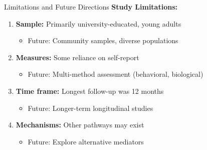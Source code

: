 \documentclass[aspectratio=169,12pt]{beamer}
\begin{document}
\begin{frame}{Limitations and Future Directions}
  \textbf{Study Limitations:}
  \begin{enumerate}
    \item \textbf{Sample:} Primarily university-educated, young adults
    \begin{itemize}
      \item Future: Community samples, diverse populations
    \end{itemize}

    \item \textbf{Measures:} Some reliance on self-report
    \begin{itemize}
      \item Future: Multi-method assessment (behavioral, biological)
    \end{itemize}

    \item \textbf{Time frame:} Longest follow-up was 12 months
    \begin{itemize}
      \item Future: Longer-term longitudinal studies
    \end{itemize}

    \item \textbf{Mechanisms:} Other pathways may exist
    \begin{itemize}
      \item Future: Explore alternative mediators
    \end{itemize}
  \end{enumerate}
\end{frame}
\end{document}
